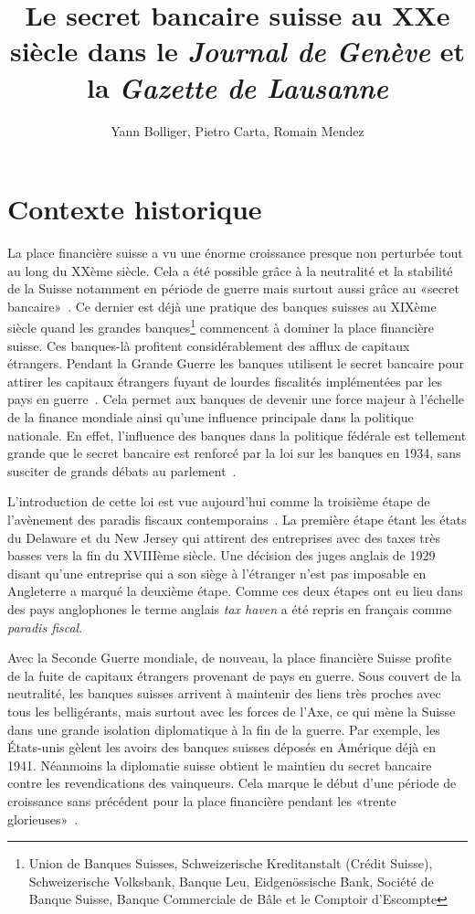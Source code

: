 \documentclass[11pt]{article}
\title{
   Le secret bancaire suisse au XXe siècle dans le
  \textit{Journal de Genève} et la \textit{Gazette de Lausanne}
}
\author{Yann Bolliger, Pietro Carta, Romain Mendez}
\begin{document}
\maketitle

\section{Contexte historique}

La place financière suisse a vu une énorme croissance presque non perturbée tout
au long du XXème siècle. Cela a été possible grâce à la neutralité et la
stabilité de la Suisse notamment en période de guerre mais surtout aussi grâce
au «secret bancaire»~\citep[p. 512]{Mazbouri12}. Ce dernier est déjà une
pratique des banques suisses au XIXème siècle quand les grandes
banques\footnote{Union de Banques Suisses, Schweizerische Kreditanstalt (Crédit
Suisse), Schweizerische Volksbank, Banque Leu, Eidgenössische Bank, Société de
Banque Suisse, Banque Commerciale de Bâle et le Comptoir d’Escompte} commencent
à dominer la place financière suisse. Ces banques-là profitent considérablement
des afflux de capitaux étrangers. Pendant la Grande Guerre les banques utilisent
le secret bancaire pour attirer les capitaux étrangers fuyant de lourdes
fiscalités implémentées par les pays en guerre~\citep[p. 484-486]{Mazbouri12}.
Cela permet aux banques de devenir une force majeur à l’échelle de la finance
mondiale ainsi qu’une influence principale dans la politique nationale.
En effet, l’influence des banques dans la politique fédérale est tellement
grande que le secret bancaire est renforcé par la loi sur les banques en 1934,
sans susciter de grands débats au parlement~\citep{Guex99}. 

L'introduction de cette loi est vue aujourd'hui comme la troisième étape de
l'avènement des paradis fiscaux contemporains~\citep[p. 29]{Chavagneux12}. La
première étape étant les états du Delaware et du New Jersey qui attirent des
entreprises avec des taxes très basses vers la fin du XVIIIème siècle. Une
décision des juges anglais de 1929 disant qu'une entreprise qui a son siège à
l'étranger n'est pas imposable en Angleterre a marqué la deuxième étape. Comme
ces deux étapes ont eu lieu dans des pays anglophones le terme anglais
\textit{tax haven} a été repris en français comme \textit{paradis fiscal}.

Avec la Seconde Guerre mondiale, de nouveau, la place financière Suisse profite
de la fuite de capitaux étrangers provenant de pays en guerre. Sous couvert de
la neutralité, les banques suisses arrivent à maintenir des liens très proches
avec tous les belligérants, mais surtout avec les forces de l’Axe, ce qui mène
la Suisse dans une grande isolation diplomatique à la fin de la guerre. Par
exemple, les États-unis gèlent les avoirs des banques suisses déposés en
Amérique déjà en 1941. Néanmoins la diplomatie suisse obtient le maintien du
secret bancaire contre les revendications des vainqueurs. Cela marque le début
d’une période de croissance sans précédent pour la place financière pendant les
«trente glorieuses»~\citep[p. 495]{Mazbouri12}.
\end{document}
